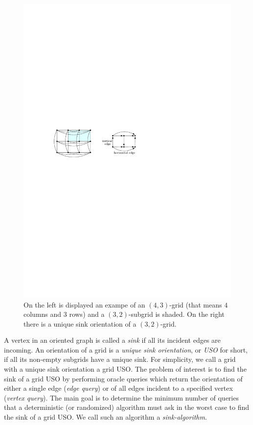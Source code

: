 \documentclass[runningheads,a4paper]{llncs}
\newcommand{\sinkalg}{sink-algorithm\xspace}
\begin{document}
  \begin{figure}[htbp] 
  	\centering
  	\includegraphics{uso_example.pdf}
  	\caption{\small On the left is displayed an exampe of an $(4,3)$-grid (that means $4$ columns and $3$ rows) 
  	and a $(3,2)$-subgrid is shaded. On the right there is a unique sink orientation of a $(3,2)$-grid.} 
  	\label{fig:examplegrid}
  \end{figure}

A vertex in an oriented graph is called a \emph{sink} if all its incident edges are incoming.
An orientation of a grid is a \emph{unique sink orientation}, or \emph{USO}
for short, if all its non-empty subgrids have a unique sink. For simplicity, we call a grid with a unique sink orientation a grid USO.
The problem of interest is to find the sink of a grid USO by performing oracle queries which return the orientation of either a single edge (\emph{edge query}) or of all edges incident to a specified vertex (\emph{vertex query}). 
The main goal is to determine the minimum number of queries that a deterministic (or randomized) algorithm must ask in the worst case to find the sink of a grid USO. We call such an algorithm a \emph{\sinkalg}.
\end{document}
